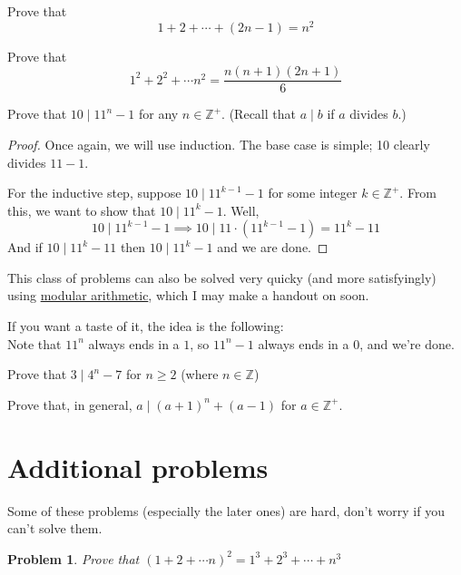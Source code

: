\documentclass[a4paper]{scrartcl}
\newtheorem{u_problem}{Problem}
\begin{document}
\begin{exercise}
	Prove that 	
	\[1 + 2 + \cdots + \left(2n-1\right) = n^2\]
\end{exercise}

\begin{exercise}
	Prove that
	\[1^2 + 2^2 + \cdots n^2 = \frac{n(n+1)(2n+1)}{6}\]
\end{exercise}


\begin{example}
	Prove that $10 \mid 11^n - 1$ for any $n \in \mathbb{Z}^+$. (Recall that $a \mid b$ if $a$ divides $b$.)
\end{example}
\begin{proof}
	Once again, we will use induction. The base case is simple; 10 clearly divides $11-1$.

	For the inductive step, suppose $10 \mid 11^{k-1} - 1$ for some integer $k \in \mathbb{Z}^+$. From this, we want to show that $10 \mid 11^k - 1$. Well,
	\[10 \mid 11^{k-1} - 1 \implies 10 \mid 11 \cdot (11^{k-1} - 1) = 11^k - 11 \]
	And if $10 \mid 11^k - 11$ then $10 \mid 11^k - 1$ and we are done.

\end{proof}
\begin{remark*}
	This class of problems can also be solved very quicky (and more satisfyingly) using \href{https://brilliant.org/wiki/modular-arithmetic/}{modular arithmetic}, which I may make a handout on soon.

	If you want a taste of it, the idea is the following: \\
	Note that $11^n$ always ends in a $1$, so $11^n - 1$ always ends in a 0, and we're done.
\end{remark*}

\begin{exercise}
	Prove that $3 \mid 4^{n} - 7$ for $n \geq 2$ (where $n \in \mathbb{Z}$)
\begin{exercise}
	Prove that, in general, $ a \mid {\left(a+1\right)}^n + \left(a-1\right)$ for $a \in \mathbb{Z}^+$.
\end{exercise}
\end{exercise}


\section{Additional problems}
Some of these problems (especially the later ones) are hard, don't worry if you can't solve them.

\begin{u_problem}
	Prove that $(1 + 2 + \cdots n)^2 = 1^3 + 2^3 + \cdots + n^3$
\end{u_problem}
\end{document}
